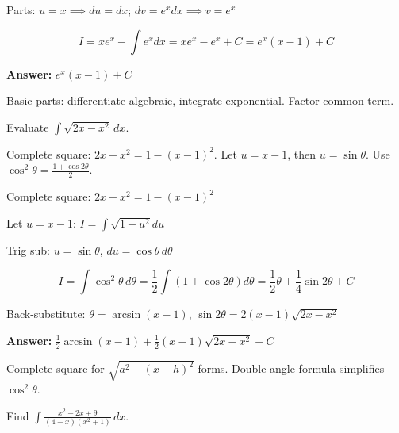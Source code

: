\begin{solution}
Parts: $u=x \implies du=dx$; $dv=e^x dx \implies v=e^x$

\[
I = xe^x - \int e^x dx = xe^x - e^x + C = e^x(x-1) + C
\]

\textbf{Answer:} $\boxed{e^x(x-1) + C}$
\end{solution}

\begin{takeaways}
Basic parts: differentiate algebraic, integrate exponential. Factor common term.
\end{takeaways}

\vspace{1cm}

\begin{problem}
Evaluate $\displaystyle \int \sqrt{2x - x^2} \, dx$.
\end{problem}

\begin{hint}
Complete square: $2x-x^2 = 1-(x-1)^2$. Let $u=x-1$, then $u=\sin\theta$. Use $\cos^2\theta = \frac{1+\cos 2\theta}{2}$.
\end{hint}

\begin{solution}
Complete square: $2x-x^2 = 1-(x-1)^2$

Let $u=x-1$: $I = \int \sqrt{1-u^2} du$

Trig sub: $u=\sin\theta$, $du=\cos\theta \, d\theta$

\[
I = \int \cos^2\theta \, d\theta = \frac{1}{2}\int(1+\cos 2\theta)d\theta = \frac{1}{2}\theta + \frac{1}{4}\sin 2\theta + C
\]

Back-substitute: $\theta = \arcsin(x-1)$, $\sin 2\theta = 2(x-1)\sqrt{2x-x^2}$

\textbf{Answer:} $\boxed{\frac{1}{2}\arcsin(x-1) + \frac{1}{2}(x-1)\sqrt{2x-x^2} + C}$
\end{solution}

\begin{takeaways}
Complete square for $\sqrt{a^2-(x-h)^2}$ forms. Double angle formula simplifies $\cos^2\theta$.
\end{takeaways}

\vspace{1cm}

\begin{problem}
Find $\displaystyle \int \frac{x^2 - 2x + 9}{(4-x)(x^2+1)} \, dx$.
\end{problem}

